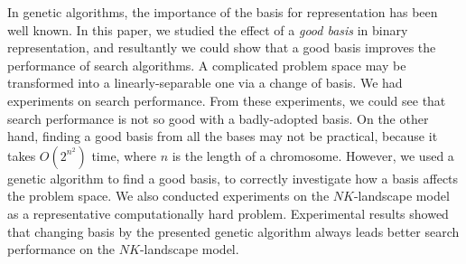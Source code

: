 In genetic algorithms, the importance of the basis for representation has been well known.
In this paper, we studied the effect of a \textit{good basis} in binary representation,
and resultantly we could show that a good basis improves the performance of search algorithms.
A complicated problem space may be transformed into a linearly-separable one via a change of basis.
We had experiments on search performance.
From these experiments, we could see that search performance is not so good with a badly-adopted basis.
On the other hand, finding a good basis from all the bases may not be practical,
because it takes $ O( 2^{n^2} ) $ time, where $ n $ is the length of a chromosome.
However, we used a genetic algorithm to find a good basis, to correctly investigate how a basis affects the problem space.
We also conducted experiments on the $ NK $-landscape model as a representative computationally hard problem.
Experimental results showed that changing basis by the presented genetic algorithm always leads better search performance on the $ NK $-landscape model.
